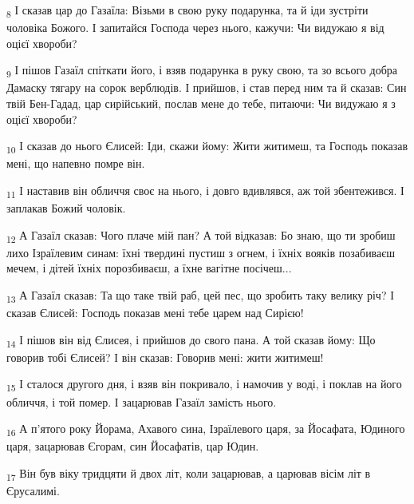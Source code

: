 \begin{tcolorbox}
\textsubscript{8} І сказав цар до Газаїла: Візьми в свою руку подарунка, та й іди зустріти чоловіка Божого. І запитайся Господа через нього, кажучи: Чи видужаю я від оцієї хвороби?
\end{tcolorbox}
\begin{tcolorbox}
\textsubscript{9} І пішов Газаїл спіткати його, і взяв подарунка в руку свою, та зо всього добра Дамаску тягару на сорок верблюдів. І прийшов, і став перед ним та й сказав: Син твій Бен-Гадад, цар сирійський, послав мене до тебе, питаючи: Чи видужаю я з оцієї хвороби?
\end{tcolorbox}
\begin{tcolorbox}
\textsubscript{10} І сказав до нього Єлисей: Іди, скажи йому: Жити житимеш, та Господь показав мені, що напевно помре він.
\end{tcolorbox}
\begin{tcolorbox}
\textsubscript{11} І наставив він обличчя своє на нього, і довго вдивлявся, аж той збентежився. І заплакав Божий чоловік.
\end{tcolorbox}
\begin{tcolorbox}
\textsubscript{12} А Газаїл сказав: Чого плаче мій пан? А той відказав: Бо знаю, що ти зробиш лихо Ізраїлевим синам: їхні твердині пустиш з огнем, і їхніх вояків позабиваєш мечем, і дітей їхніх порозбиваєш, а їхне вагітне посічеш...
\end{tcolorbox}
\begin{tcolorbox}
\textsubscript{13} А Газаїл сказав: Та що таке твій раб, цей пес, що зробить таку велику річ? І сказав Єлисей: Господь показав мені тебе царем над Сирією!
\end{tcolorbox}
\begin{tcolorbox}
\textsubscript{14} І пішов він від Єлисея, і прийшов до свого пана. А той сказав йому: Що говорив тобі Єлисей? І він сказав: Говорив мені: жити житимеш!
\end{tcolorbox}
\begin{tcolorbox}
\textsubscript{15} І сталося другого дня, і взяв він покривало, і намочив у воді, і поклав на його обличчя, і той помер. І зацарював Газаїл замість нього.
\end{tcolorbox}
\begin{tcolorbox}
\textsubscript{16} А п'ятого року Йорама, Ахавого сина, Ізраїлевого царя, за Йосафата, Юдиного царя, зацарював Єгорам, син Йосафатів, цар Юдин.
\end{tcolorbox}
\begin{tcolorbox}
\textsubscript{17} Він був віку тридцяти й двох літ, коли зацарював, а царював вісім літ в Єрусалимі.
\end{tcolorbox}
